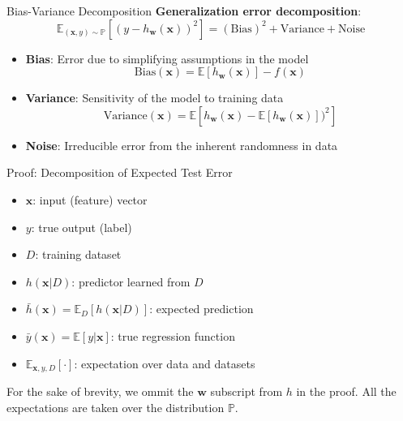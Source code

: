 \documentclass[serif, aspectratio=169]{beamer}
\begin{document}
\begin{frame}{Bias-Variance Decomposition}
    \textbf{Generalization error decomposition}:
    \[
    \mathbb{E}_{(\mathbf{x}, y) \sim \mathbb{P}}[(y - h_{\mathbf{w}}(\mathbf{x}))^2] = (\text{Bias})^2 + \text{Variance} + \text{Noise}
    \]
    \begin{itemize}
        \item \textbf{Bias}: Error due to simplifying assumptions in the model
        \[
        \text{Bias}(\mathbf{x}) = \mathbb{E}[h_{\mathbf{w}}(\mathbf{x})] - f(\mathbf{x})
        \]
        \item \textbf{Variance}: Sensitivity of the model to training data
        \[
        \text{Variance}(\mathbf{x}) = \mathbb{E}[h_{\mathbf{w}}(\mathbf{x}) - \mathbb{E}[h_{\mathbf{w}}(\mathbf{x})])^2]
        \]
        \item \textbf{Noise}: Irreducible error from the inherent randomness in data
    \end{itemize}
\end{frame}


\begin{frame}{Proof: Decomposition of Expected Test Error}
    
    \begin{itemize}
        \item $\mathbf{x}$: input (feature) vector
        \item $y$: true output (label)
        \item $D$: training dataset
        \item $h(\mathbf{x} \vert D)$: predictor learned from $D$
        \item $\bar{h}(\mathbf{x}) = \mathbb{E}_D[h(\mathbf{x} \vert D)]$: expected prediction
        \item $\bar{y}(\mathbf{x}) = \mathbb{E}[y \vert \mathbf{x}]$: true regression function
        \item $\mathbb{E}_{\mathbf{x},y,D}[\cdot]$: expectation over data and datasets
    \end{itemize}
    
For the sake of brevity, we ommit the \(\mathbf{w}\) subscript from \(h\) in the proof. All the expectations are taken over the distribution \(\mathbb{P}\).
\end{frame}
\end{document}
